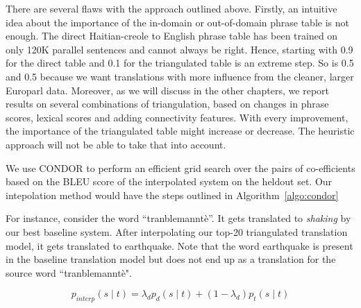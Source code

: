 		There are several flaws with the approach outlined above. Firstly, an intuitive idea about the importance of the in-domain or out-of-domain phrase table is not enough. The direct Haitian-creole to English phrase table has been trained on only 120K parallel sentences and cannot always be right. Hence, starting with 0.9 for the direct table and 0.1 for the triangulated table is an extreme step. So is 0.5 and 0.5 because we want translations with more influence from the cleaner, larger Europarl data. Moreover, as we will discuss in the other chapters, we report results on several combinations of triangulation, based on changes in phrase scores, lexical scores and adding connectivity features. With every improvement, the importance of the triangulated table might increase or decrease. The heuristic approach will not be able to take that into account. 

		We use CONDOR to perform an efficient grid search over the pairs of co-efficients based on the BLEU score of the interpolated system on the heldout set. Our intepolation method would have the steps outlined in Algorithm~\ref{algo:condor}
 
		
        For instance, consider the word ``tranblemannt\`e''. It gets translated to \emph{shaking} by our best baseline system. After interpolating our top-20 triangulated translation model, it gets translated to earthquake. Note that the word earthquake is present in the baseline translation model but does not end up as a translation for the source word ``tranblemannt\`e".


        \begin{equation} \label{eq:interpolation}
                p_{interp}(s \mid t) = \lambda_{d} p_{d}(s \mid t) + (1 - \lambda_{d}) p_{t}(s \mid t)
        \end{equation}

